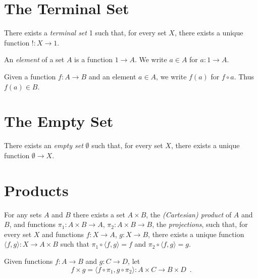 \section{The Terminal Set}

\begin{ax}
  There exists a \emph{terminal set} 1 such that, for every set $X$, there exists a unique function $! : X \rightarrow 1$.
\end{ax}

\begin{df}[Element]
  An \emph{element} of a set $A$ is a function $1 \rightarrow A$. We write $a \in A$ for $a : 1 \rightarrow A$.

  Given a function $f : A \rightarrow B$ and an element $a \in A$, we write $f(a)$ for $f \circ a$. Thus $f(a) \in B$.
\end{df}

\section{The Empty Set}

\begin{ax}
  There exists an \emph{empty set} $\emptyset$ such that, for every set $X$, there exists a unique function $\emptyset \rightarrow X$.
\end{ax}

\section{Products}

\begin{ax}[Products]
  For any sets $A$ and $B$ there exists a set $A \times B$, the \emph{(Cartesian) product} of $A$ and $B$, and functions $\pi_1 : A \times B \rightarrow A$, $\pi_2 : A \times B \rightarrow B$, the \emph{projections}, such that, for every set $X$ and functions $f : X \rightarrow A$, $g : X \rightarrow B$, there exists a unique function $\langle f, g \rangle : X \rightarrow A \times B$ such that $\pi_1 \circ \langle f, g \rangle = f$ and $\pi_2 \circ \langle f, g \rangle = g$.
\end{ax}

\begin{df}
  Given functions $f : A \rightarrow B$ and $g : C \rightarrow D$, let
  \[ f \times g = \langle f \circ \pi_1, g \circ \pi_2 \rangle : A \times C \rightarrow B \times D \enspace . \]
\end{df}

